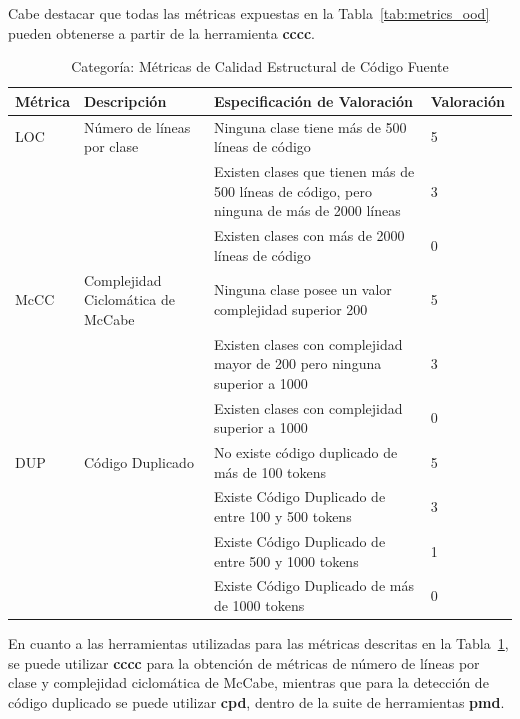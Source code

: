\documentclass[11pt]{article}
\begin{document}
Cabe destacar que todas las métricas expuestas en la Tabla~\ref{tab:metrics_ood} pueden obtenerse a partir de la herramienta \textbf{cccc}.

\begin{table}[H]
  \begin{center}
    \begin{tabular}{ | p{1.6cm} | p{3cm} | p{8cm} | p{2cm} | }
    \toprule
    \textbf{Métrica} & \textbf{Descripción} & \textbf{Especificación de Valoración} & \textbf{Valoración} \\
    \hline
    LOC & Número de líneas por clase & Ninguna clase tiene más de 500 líneas de código & 5 \\ \cline{3-3} \cline{4-4} 
    & & Existen clases que tienen más de 500 líneas de código, pero ninguna de más de 2000 líneas & 3 \\ \cline{3-3}\cline{4-4}
    & & Existen clases con más de 2000 líneas de código & 0 \\ \cline{3-3}\cline{4-4}
    \hline
    McCC & Complejidad Ciclomática de McCabe & Ninguna clase posee un valor complejidad superior 200 & 5 \\ \cline{3-3} \cline{4-4} 
    & & Existen clases con complejidad mayor de 200 pero ninguna superior a 1000 & 3 \\ \cline{3-3}\cline{4-4}
    & & Existen clases con complejidad superior a 1000 & 0 \\ \cline{3-3}\cline{4-4}
    \hline
    DUP & Código Duplicado & No existe código duplicado de más de 100 tokens & 5 \\ \cline{3-3} \cline{4-4} 
    & & Existe Código Duplicado de entre 100 y 500 tokens & 3 \\ \cline{3-3}\cline{4-4}
    & & Existe Código Duplicado de entre 500 y 1000 tokens & 1 \\ \cline{3-3}\cline{4-4}
    & & Existe Código Duplicado de más de 1000 tokens & 0 \\ 
    \bottomrule
    \end{tabular}
    \caption{Categoría: Métricas de Calidad Estructural de Código Fuente}
    \label{tab:metrics_struct}
  \end{center}
\end{table}

En cuanto a las herramientas utilizadas para las métricas descritas en la Tabla~\ref{tab:metrics_struct}, se puede utilizar \textbf{cccc} para la obtención de métricas de número de líneas por clase y complejidad ciclomática de McCabe, mientras que para la detección de código duplicado se puede utilizar \textbf{cpd}, dentro de la suite de herramientas \textbf{pmd}.
\end{document}
